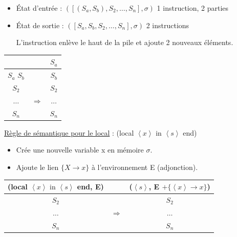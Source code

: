 \documentclass[fr,license=none,skiptoc]{../../../eplsummary}
\begin{document}
\begin{flushleft}
\begin{itemize}
\item État d'entrée : \textcolor{miorangerouge}{$([(S_a, S_b), S_2, \ldots , S_n ], \sigma )$} 1 instruction, 2 parties
\item État de sortie : \textcolor{miorangerouge}{$([S_a, S_b, S_2, \ldots , S_n ], \sigma )$} 2 instructions

L'instruction enlève le haut de la pile et ajoute 2 nouveaux éléments.
\end{itemize}\bigbreak

\begin{center}
\begin{tabular}{|c|c|c|}
 & & $S_a$ \\
\hline
$S_a$ $S_b$ & & $S_b$\\
\hline
$S_2$ & & $S_2$\\
\hline
$\ldots$ & $\Rightarrow$ & $\ldots$\\
\hline
$S_n$ & & $S_n$\\
\hline
\end{tabular}
\end{center}
\newpage




\textcolor{mauvedef}{\underline{Règle de sémantique pour le local}} : (\textcolor{miorangerouge}{local $\left\langle x \right\rangle \text{ in } \left\langle s \right\rangle$ end})

\begin{itemize}
\item Crée une nouvelle variable \textcolor{miorangerouge}{x} en mémoire \textcolor{miorangerouge}{$\sigma$}.
\item Ajoute le lien \textcolor{miorangerouge}{$\{ X \rightarrow x \}$} à l'environnement \textcolor{miorangerouge}{E} (adjonction).
\end{itemize}\bigbreak

\begin{center}
\begin{tabular}{|c|c|c|}
(local $\left\langle x \right\rangle \text{ in } \left\langle s \right\rangle$ end, E) & & ($\left\langle s \right\rangle$, E $+ \{ \left\langle x \right\rangle \rightarrow x \}$)\\
\hline
$S_2$ & & $S_2$\\
\hline
$\ldots$ & $\Rightarrow$ & $\ldots$\\
\hline
$S_n$ & & $S_n$\\
\hline
\end{tabular}
\end{center}
\bigbreak


\end{flushleft}
\end{document}
